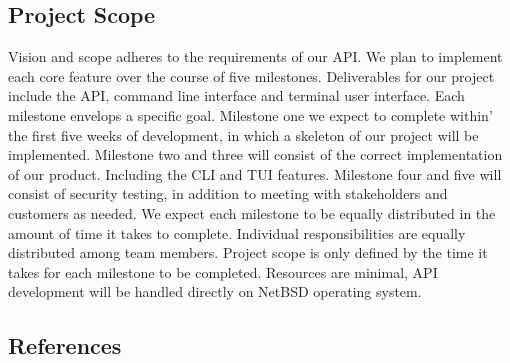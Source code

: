 \subsection{Project Scope}
Vision and scope adheres to the requirements of our API. We plan to implement each core feature over the course of five milestones. Deliverables for our project include the API, command line interface and terminal user interface. Each milestone envelops a specific goal. Milestone one we expect to complete within’ the first five weeks of development, in which a skeleton of our project will be implemented. Milestone two and three will consist of the correct implementation of our product. Including the CLI and TUI features. Milestone four and five will consist of security testing, in addition to meeting with stakeholders and customers as needed. We expect each milestone to be equally distributed in the amount of time it takes to complete. Individual responsibilities are equally distributed among team members. Project scope is only defined by the time it takes for each milestone to be completed. Resources are minimal, API development will be handled directly on NetBSD operating system. 

\subsection{References}


